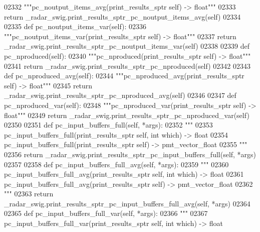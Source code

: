 \begin{DoxyCode}
{{{{{{{{{02332         \textcolor{stringliteral}{"""pc\_noutput\_items\_avg(print\_results\_sptr self) -> float"""}
02333         \textcolor{keywordflow}{return} \_radar\_swig.print\_results\_sptr\_pc\_noutput\_items\_avg(self)
02334 
02335     \textcolor{keyword}{def }pc_noutput_items_var(self):
02336         \textcolor{stringliteral}{"""pc\_noutput\_items\_var(print\_results\_sptr self) -> float"""}
02337         \textcolor{keywordflow}{return} \_radar\_swig.print\_results\_sptr\_pc\_noutput\_items\_var(self)
02338 
02339     \textcolor{keyword}{def }pc_nproduced(self):
02340         \textcolor{stringliteral}{"""pc\_nproduced(print\_results\_sptr self) -> float"""}
02341         \textcolor{keywordflow}{return} \_radar\_swig.print\_results\_sptr\_pc\_nproduced(self)
02342 
02343     \textcolor{keyword}{def }pc_nproduced_avg(self):
02344         \textcolor{stringliteral}{"""pc\_nproduced\_avg(print\_results\_sptr self) -> float"""}
02345         \textcolor{keywordflow}{return} \_radar\_swig.print\_results\_sptr\_pc\_nproduced\_avg(self)
02346 
02347     \textcolor{keyword}{def }pc_nproduced_var(self):
02348         \textcolor{stringliteral}{"""pc\_nproduced\_var(print\_results\_sptr self) -> float"""}
02349         \textcolor{keywordflow}{return} \_radar\_swig.print\_results\_sptr\_pc\_nproduced\_var(self)
02350 
02351     \textcolor{keyword}{def }pc_input_buffers_full(self, *args):
02352         \textcolor{stringliteral}{"""}
02353 \textcolor{stringliteral}{        pc\_input\_buffers\_full(print\_results\_sptr self, int which) -> float}
02354 \textcolor{stringliteral}{        pc\_input\_buffers\_full(print\_results\_sptr self) -> pmt\_vector\_float}
02355 \textcolor{stringliteral}{        """}
02356         \textcolor{keywordflow}{return} \_radar\_swig.print\_results\_sptr\_pc\_input\_buffers\_full(self, *args)
02357 
02358     \textcolor{keyword}{def }pc_input_buffers_full_avg(self, *args):
02359         \textcolor{stringliteral}{"""}
02360 \textcolor{stringliteral}{        pc\_input\_buffers\_full\_avg(print\_results\_sptr self, int which) -> float}
02361 \textcolor{stringliteral}{        pc\_input\_buffers\_full\_avg(print\_results\_sptr self) -> pmt\_vector\_float}
02362 \textcolor{stringliteral}{        """}
02363         \textcolor{keywordflow}{return} \_radar\_swig.print\_results\_sptr\_pc\_input\_buffers\_full\_avg(self, *args)
02364 
02365     \textcolor{keyword}{def }pc_input_buffers_full_var(self, *args):
02366         \textcolor{stringliteral}{"""}
02367 \textcolor{stringliteral}{        pc\_input\_buffers\_full\_var(print\_results\_sptr self, int which) -> float}
}}}}}}}}}
\end{DoxyCode}
